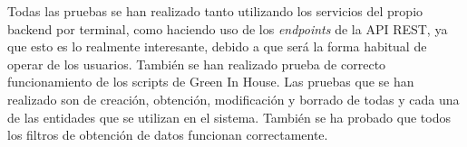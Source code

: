 Todas las pruebas se han realizado tanto utilizando los servicios del propio backend por terminal, como haciendo uso de los \textit{endpoints} de la API REST, ya que esto es lo realmente interesante, debido a que será la forma habitual de operar de los usuarios. También se han realizado prueba de correcto funcionamiento de los scripts de Green In House. Las pruebas que se han realizado son de creación, obtención, modificación y borrado de todas y cada una de las entidades que se utilizan en el sistema. También se ha probado que todos los filtros de obtención de datos funcionan correctamente.

